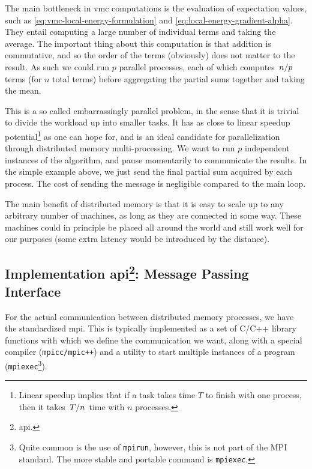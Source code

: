 \documentclass[Thesis.tex]{subfiles}
\begin{document}
The main bottleneck in \gls{vmc} computations is the evaluation of expectation
values, such as \cref{eq:vmc-local-energy-formulation} and
\cref{eq:local-energy-gradient-alpha}. They entail computing a large number of
individual terms and taking the average. The important thing about this
computation is that addition is commutative, and so the order of the terms
(obviously) does not matter to the result. As such we could run $p$ parallel processes, each
of which computes $\flatfrac{n}{p}$ terms (for $n$ total terms) before aggregating the partial sums
together and taking the mean.

This is a so called embarrassingly parallel problem, in the sense that it is
trivial to divide the workload up into smaller tasks. It has as close to linear
speedup potential\footnote{Linear speedup implies that if a task takes time $T$
to finish with one process, then it takes $\flatfrac{T}{n}$ time with $n$
processes.} as one can hope for, and is an ideal candidate for parallelization
through distributed memory multi-processing. We want to run $p$ independent
instances of the algorithm, and pause momentarily to communicate the results. In
the simple example above, we just send the final partial sum acquired by each
process. The cost of sending the message is negligible compared to the main
loop.

The main benefit of distributed memory is that it is easy to scale up to any
arbitrary number of machines, as long as they are connected in some way. These
machines could in principle be placed all around the world and still work well
for our purposes (some extra latency would be introduced by the distance).

\subsection[Implementation \acrshort{api}: Message Passing Interface]{Implementation \acrshort{api}\footnote{\Acrfull{api}.}: Message Passing Interface}

For the actual communication between distributed memory processes, we have the
standardized \gls{mpi}. This is typically implemented as a
set of C/C++ library functions with which we define the communication we want,
along with a special compiler (\texttt{mpicc/mpic++}) and a utility to start
multiple instances of a program (\texttt{mpiexec}\footnote{Quite common is the
  use of \texttt{mpirun}, however, this is not part of the MPI standard. The
  more stable and portable command is \texttt{mpiexec}.}).
\end{document}
